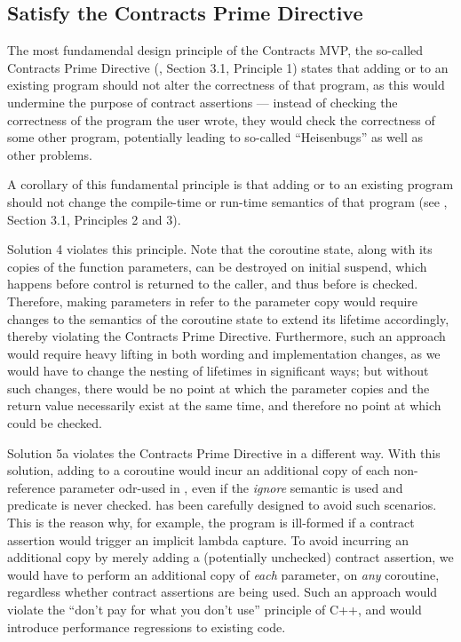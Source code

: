 \subsection{Satisfy the Contracts Prime Directive}
\label{goal_prime_directive}

The most fundamendal design principle of the Contracts MVP, the so-called Contracts Prime Directive (\cite{P2900R8}, Section 3.1, Principle 1) states that adding  or  to an existing program should not alter the correctness of that program, as this would undermine the purpose of contract assertions --- instead of checking the correctness of the program the user wrote, they would check the correctness of some other program, potentially leading to so-called ``Heisenbugs'' as well as other problems.

A corollary of this fundamental principle is that adding  or  to an existing program should not change the compile-time or run-time semantics of that program (see \cite{P2900R8}, Section 3.1, Principles 2 and 3).

Solution 4 violates this principle. Note that the coroutine state, along with its copies of the function parameters, can be destroyed on initial suspend, which happens before control is returned to the caller, and thus before  is checked. Therefore, making parameters in  refer to the parameter copy would require changes to the semantics of the coroutine state to extend its lifetime accordingly, thereby violating the Contracts Prime Directive. Furthermore, such an approach would require heavy lifting in both wording and implementation changes, as we would have to change the nesting of lifetimes in significant ways; but without such changes, there would be no point at which the parameter copies and the return value necessarily exist at the same time, and therefore no point at which  could be checked.

Solution 5a violates the Contracts Prime Directive in a different way. With this solution, adding  to a coroutine would incur an additional copy of each non-reference parameter odr-used in , even if the \emph{ignore} semantic is used and predicate is never checked. \cite{P2900R8} has been carefully designed to avoid such scenarios. This is the reason why, for example, the program is ill-formed if a contract assertion would trigger an implicit lambda capture. To avoid incurring an additional copy by merely adding a (potentially unchecked) contract assertion, we would have to perform an additional copy of \emph{each} parameter, on \emph{any} coroutine, regardless whether contract assertions are being used. Such an approach would  violate the ``don't pay for what you don't use'' principle of C++, and would introduce performance regressions to existing code.

